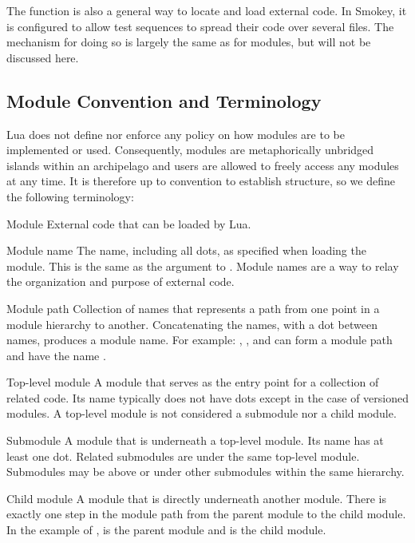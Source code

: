 The  function is also a general way to locate and load
external code.  In Smokey, it is configured to allow test sequences to spread
their code over several files.  The mechanism for doing so is largely the same
as for modules, but will not be discussed here.

\subsection{Module Convention and Terminology}

Lua does not define nor enforce any policy on how modules are to be implemented
or used.  Consequently, modules are metaphorically unbridged islands within an
archipelago and users are allowed to freely access any modules at any time.  It
is therefore up to convention to establish structure, so we define the
following terminology:

\begin{Definition}

	\item[Module] External code that can be loaded by Lua.

	\item[Module name] The name, including all dots, as specified when
	loading the module.  This is the same as the argument to
	.  Module names are a way to relay the organization
	and purpose of external code.

	\item[Module path] Collection of names that represents a path from one
	point in a module hierarchy to another.  Concatenating the names, with
	a dot between names, produces a module name.  For example:
	, , and  can form a module path and
	have the name .

	\item[Top-level module] A module that serves as the entry point for a
	collection of related code.  Its name typically does not have dots
	except in the case of versioned modules.  A top-level module is not
	considered a submodule nor a child module.

	\item[Submodule] A module that is underneath a top-level module.  Its
	name has at least one dot.  Related submodules are under the same
	top-level module.  Submodules may be above or under other submodules
	within the same hierarchy.

	\item[Child module] A module that is directly underneath another
	module.  There is exactly one step in the module path from the parent
	module to the child module.  In the example of ,
	 is the parent module and  is the child
	module.

\end{Definition}

